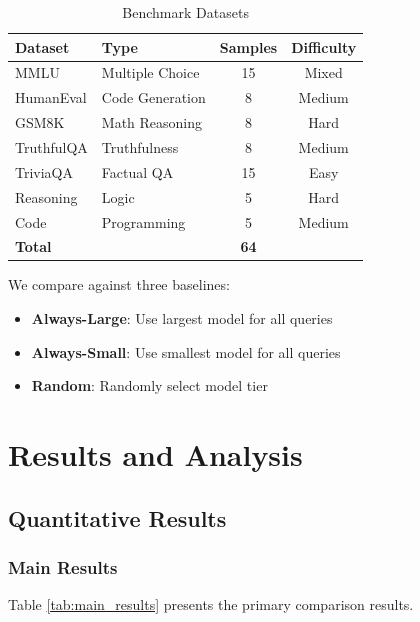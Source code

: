 \documentclass[conference]{IEEEtran}
\begin{document}
\begin{table}[h]
\centering
\caption{Benchmark Datasets}
\label{tab:datasets}
\begin{tabular}{llcc}
\toprule
\textbf{Dataset} & \textbf{Type} & \textbf{Samples} & \textbf{Difficulty} \\
\midrule
MMLU \cite{hendrycks2021mmlu} & Multiple Choice & 15 & Mixed \\
HumanEval \cite{chen2021humaneval} & Code Generation & 8 & Medium \\
GSM8K \cite{cobbe2021gsm8k} & Math Reasoning & 8 & Hard \\
TruthfulQA \cite{lin2022truthfulqa} & Truthfulness & 8 & Medium \\
TriviaQA & Factual QA & 15 & Easy \\
Reasoning & Logic & 5 & Hard \\
Code & Programming & 5 & Medium \\
\midrule
\textbf{Total} & & \textbf{64} & \\
\bottomrule
\end{tabular}
\end{table}

We compare against three baselines:

\begin{itemize}
    \item \textbf{Always-Large}: Use largest model for all queries
    \item \textbf{Always-Small}: Use smallest model for all queries
    \item \textbf{Random}: Randomly select model tier
\end{itemize}

\section{Results and Analysis}

\subsection{Quantitative Results}

\subsubsection{Main Results}

Table \ref{tab:main_results} presents the primary comparison results.
\end{document}
